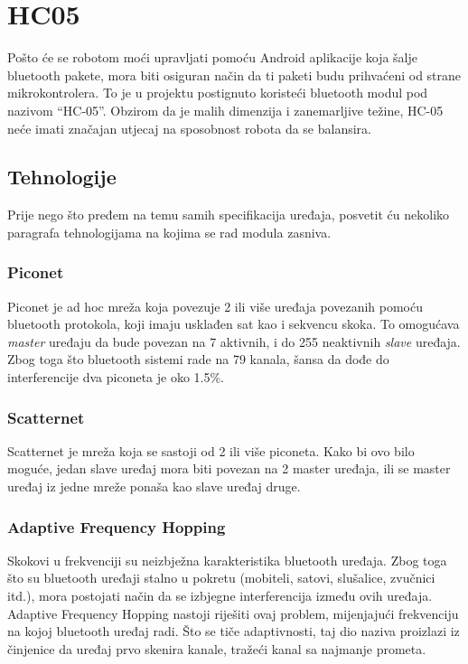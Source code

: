 \documentclass[../Document.tex]{subfiles}
\begin{document}
\section{HC05}\label{hc}
Pošto će se robotom moći upravljati pomoću Android aplikacije koja šalje bluetooth pakete, mora biti osiguran način da ti paketi budu prihvaćeni od strane mikrokontrolera. To je u projektu postignuto koristeći bluetooth modul pod nazivom ``HC-05''. Obzirom da je malih dimenzija i zanemarljive težine, HC-05 neće imati značajan utjecaj na sposobnost robota da se balansira.

\subsection{Tehnologije}
Prije nego što pređem na temu samih specifikacija uređaja, posvetit ću nekoliko paragrafa tehnologijama na kojima se rad modula zasniva.

\subsubsection{Piconet}
Piconet je ad hoc mreža koja povezuje 2 ili više uređaja povezanih pomoću bluetooth protokola, koji imaju usklađen sat kao i sekvencu skoka. To omogućava \textit{master} uređaju da bude povezan na 7 aktivnih, i do 255 neaktivnih \textit{slave} uređaja. Zbog toga što bluetooth sistemi rade na 79 kanala, šansa da dođe do interferencije dva piconeta je oko 1.5\%.
\vspace{1cm}

\subsubsection{Scatternet}
Scatternet je mreža koja se sastoji od 2 ili više piconeta. Kako bi ovo bilo moguće, jedan slave uređaj mora biti povezan na 2 master uređaja, ili se master uređaj iz jedne mreže ponaša kao slave uređaj druge.

\subsubsection{Adaptive Frequency Hopping}
Skokovi u frekvenciji su neizbježna karakteristika bluetooth uređaja. Zbog toga što su bluetooth uređaji stalno u pokretu (mobiteli, satovi, slušalice, zvučnici itd.), mora postojati način da se izbjegne interferencija između ovih uređaja. Adaptive Frequency Hopping nastoji riješiti ovaj problem, mijenjajući frekvenciju na kojoj bluetooth uređaj radi. Što se tiče adaptivnosti, taj dio naziva proizlazi iz činjenice da uređaj prvo skenira kanale, tražeći kanal sa najmanje prometa.
\end{document}
